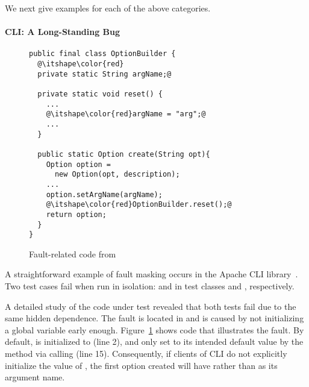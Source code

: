 
We next give examples for each of the above categories.

\paragraph{CLI: A Long-Standing Bug}

\begin{figure}
\begin{lstlisting}
public final class OptionBuilder {
  @\itshape\color{red}
  private static String argName;@
  
  private static void reset() {
    ...
    @\itshape\color{red}argName = "arg";@
    ...
  }
   
  public static Option create(String opt){
    Option option = 
      new Option(opt, description);
    ...
    option.setArgName(argName);
    @\itshape\color{red}OptionBuilder.reset();@
    return option;
  }
}
\end{lstlisting}
\caption{Fault-related code from }
\label{fig:option_builder}
\end{figure}

A straightforward example of fault masking occurs in the Apache CLI
library~\cite{cli}.
Two test cases fail when run in isolation:
 and  in test
classes  and ,
respectively.

A detailed study of the code under test revealed that both 
tests fail due to the same hidden dependence. The fault is located in 
 and is caused by not initializing a global
variable early enough.
Figure~\ref{fig:option_builder} shows code that
illustrates the fault. 
%
By default,
 is initialized to  (line 2), and only set to
its intended default value  by the  method
via calling  (line 15). 
Consequently, if clients of CLI do not explicitly initialize the value of
, the first option created will have  rather
than  as its argument name.

